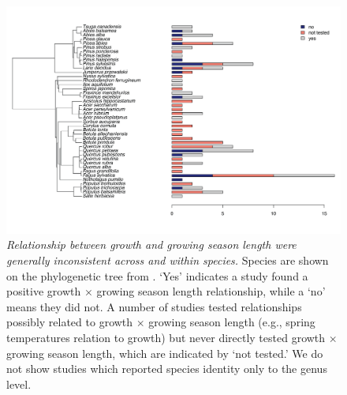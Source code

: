 \documentclass[11pt]{article}
\begin{document}
\clearpage
\begin{figure}[h!]
\includegraphics[width=1\textwidth]{..//figures/speciesnumsphylo/phylosppcountsadj.png}  %
\caption{\emph{Relationship between growth and growing season length were generally inconsistent across and within species.} Species are shown on the phylogenetic tree from \cite{smith2018constructing}. `Yes' indicates a study found a positive growth $\times$ growing season length relationship, while a `no' means they did not. A number of studies tested relationships possibly related to growth $\times$ growing season length (e.g., spring temperatures relation to growth) but never directly tested growth $\times$ growing season length, which are indicated by `not tested.' We do not show studies which reported species identity only to the genus level.}
\label{fig:sppfinds}
\end{figure}
\end{document}
